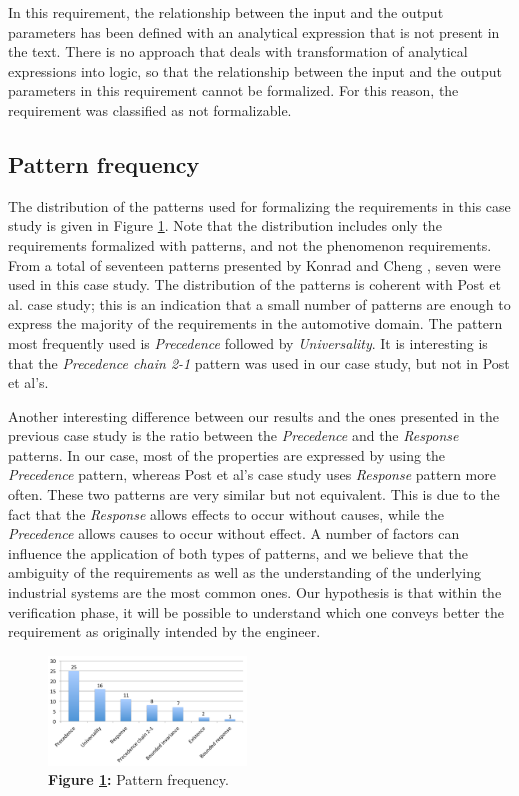 \documentclass[conference]{IEEEtran}
\begin{document}
In this requirement, the relationship between the input and the output parameters has been defined with an analytical expression that is not present in the text. There is no approach that deals with transformation of analytical expressions into logic, so that the relationship between the input and the output parameters in this requirement cannot be formalized. For this reason, the requirement was classified as not formalizable. 

\subsection{Pattern frequency}

The distribution of the patterns used for formalizing the requirements in this case study is given in Figure \ref{fig:patternFreq}. Note that the distribution includes only the requirements formalized with patterns, and not the phenomenon requirements. From a total of seventeen patterns presented by Konrad and Cheng \cite{Konrad05sps}, seven were used in this case study. The distribution of the patterns is coherent with Post et al. \cite{Post12bosch} case study; this is an indication that a small number of patterns are enough to express the majority of the requirements in the automotive domain. The pattern most frequently used is  \textit{Precedence} followed by \textit{Universality}. It is interesting is that the \textit{Precedence chain 2-1} pattern was used in our case study, but not in Post et al's.

Another interesting difference between our results and the ones presented in the previous case study is the ratio between the \textit{Precedence} and the \textit{Response} patterns. In our case, most of the properties are expressed by using the \textit{Precedence} pattern, whereas Post et al's case study uses \textit{Response} pattern more often. These two patterns are very similar but not equivalent. This is due to the fact that the \textit{Response} allows effects to occur without causes, while the \textit{Precedence} allows causes to occur without effect. A number of factors can influence the application of both types of patterns, and we believe that the ambiguity of the requirements as well as the understanding of the underlying industrial systems are the most common ones. Our hypothesis is that within the verification phase, it will be possible to understand which one conveys better the requirement as originally intended by the engineer.

\begin{figure}
  \centering
    \includegraphics[width=0.47\textwidth]{pattern_ferquency_2.pdf}
      \caption{\textbf{Figure \ref{fig:patternFreq}:} Pattern frequency.}
      \label{fig:patternFreq}
\end{figure}
\end{document}
